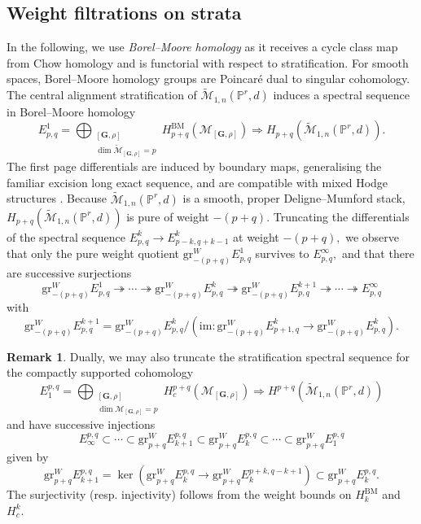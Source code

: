 \documentclass[12pt,reqno]{amsart}
\theoremstyle{definition}
\theoremstyle{definition}
\theoremstyle{definition}
\theoremstyle{definition}
\newtheorem{remark}[theorem]{Remark}
\newcommand{\PP}{\mathbb{P}}
\newcommand{\Mtil}{\widetilde{\mathcal{M}}}
\begin{document}
\subsection{Weight filtrations on strata} In the following, we use \emph{Borel--Moore homology} as it receives a cycle class map from Chow homology and is functorial with respect to stratification. For smooth spaces, Borel--Moore homology groups are Poincaré dual to singular cohomology. The central alignment stratification of $\Mtil_{1,n}(\PP^r,d)$ induces a spectral sequence in Borel--Moore homology $$E^1_{p,q} = \bigoplus_{\substack{[\mathbf{G},\rho]\\ \dim \Mtil_{[\mathbf{G},\rho]} = p}} H^{\mathrm{BM}}_{p+q}(\mathcal{M}_{[\mathbf{G},\rho]})\Rightarrow H_{p+q}(\Mtil_{1,n}(\PP^r,d)).$$ The first page differentials are induced by boundary maps, generalising the familiar excision long exact sequence, and are compatible with mixed Hodge structures \cite[Lemma 3.8]{ara}. Because $\Mtil_{1,n}(\PP^r,d)$ is a smooth, proper Deligne--Mumford stack, $H_{p+q}(\Mtil_{1,n}(\PP^r,d))$ is pure of weight $-(p+q).$ Truncating the differentials of the spectral sequence $E^{k}_{p,q}\to E^{k}_{p-k,q+k-1}$ at weight $-(p+q),$ we observe that only the pure weight quotient $\mathrm{gr}^W_{-(p+q)}E^1_{p,q}$ survives to $E^{\infty}_{p,q},$ and that there are successive surjections $$\mathrm{gr}^{W}_{-(p+q)}E^1_{p,q}\twoheadrightarrow \cdots \twoheadrightarrow \mathrm{gr}^{W}_{-(p+q)} E^{k}_{p,q} \twoheadrightarrow \mathrm{gr}^{W}_{-(p+q)} E^{k+1}_{p,q} \twoheadrightarrow \cdots \twoheadrightarrow E^{\infty}_{p,q}$$ with $$\mathrm{gr}^W_{-(p+q)} E^{k+1}_{p,q} = \mathrm{gr}^W_{-(p+q)} E^{k}_{p,q}/\left(\mathrm{im}: \mathrm{gr}^W_{-(p+q)} E^{k}_{p+1,q}\to \mathrm{gr}^W_{-(p+q)} E^{k}_{p,q}\right).$$

\begin{remark}
  Dually, we may also truncate the stratification spectral sequence for the compactly supported cohomology
$$E_1^{p,q} = \bigoplus_{\substack{[\mathbf{G},\rho]\\ \dim \mathcal{M}_{[\mathbf{G},\rho]} = p}}H_c^{p+q}(\mathcal{M}_{[\mathbf{G},\rho]})\Rightarrow H^{p+q}(\Mtil_{1,n}(\PP^r,d))$$ 
and have successive injections $$E_{\infty}^{p,q}\subset \cdots\subset \mathrm{gr}^{W}_{p+q} E_{k+1}^{p,q}\subset \mathrm{gr}^{W}_{p+q} E_{k}^{p,q}\subset\cdots \subset\mathrm{gr}^{W}_{p+q}E_1^{p,q}$$ given by $$\mathrm{gr}^{W}_{p+q} E_{k+1}^{p,q} = \ker\left( \mathrm{gr}^{W}_{p+q} E_{k}^{p,q}\to \mathrm{gr}^{W}_{p+q} E_{k}^{p+k, q-k+1}\right)\subset \mathrm{gr}^{W}_{p+q} E_{k}^{p,q}.$$ The surjectivity (resp. injectivity) follows from the weight bounds on $H_k^{\mathrm{BM}}$ and $H_c^k.$
\end{remark}
\end{document}
